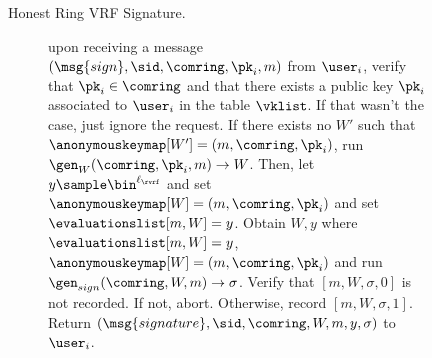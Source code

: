 \begin{figure}
\begin{tcolorbox}
{\begin{description}
				
				\item[Honest Ring VRF Signature.] upon receiving a message $(\msg{sign}, \sid, \comring, \pk_i, m)$ from $\user_i$, verify that $\pk_i \in \comring$ and that there exists a public key $\pk_i$ associated to $\user_i$ in the table $ \vklist $. If that wasn't the case, just ignore the request. 	
				If there exists no $ W' $ such that $ \anonymouskeymap[W'] = (m, \comring, \pk_i) $, run $ \gen_W(\comring, \pk_i, m) \rightarrow W$. Then, let $y \sample \bin^{\ell_\rvrf}$ and set $ \anonymouskeymap[W] = (m, \comring,\pk_i) $ and set $ \evaluationslist[m, W] = y$.
				Obtain $ W, y $ where  $ \evaluationslist[m, W] = y$, $ \anonymouskeymap[W] = (m, \comring,\pk_i) $ and run  $ \gen_{sign}(\comring, W, m) \rightarrow \sigma $. Verify that $ [m, W, \sigma, 0] $ is not recorded. If not, abort. Otherwise, record $ [m, W, \sigma, 1] $. Return $(\msg{signature}, \sid, \comring,W,m, y, \sigma)$ to $\user_i$.
				
				

\end{description}}
\end{tcolorbox}
\end{figure}
